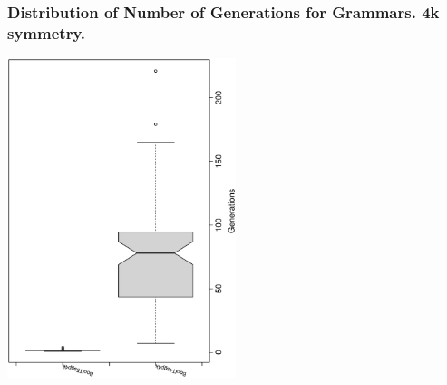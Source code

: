  \begin{frame}
 \frametitle{ Distribution of Number of Generations for Grammars. 4k  symmetry. }
 \begin{center}
\includegraphics[width=0.5\textwidth, angle=-90]
{ExpEboxplottGenerations002.eps}
 \end{center}
 \label{ExpEboxplottGenerations002.eps}  
 \end{frame}

